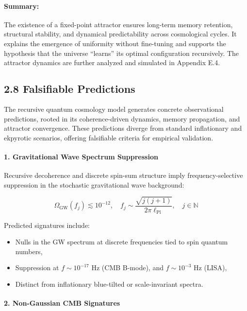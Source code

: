 \paragraph{Summary:}

The existence of a fixed-point attractor ensures long-term memory retention, structural stability, and dynamical predictability across cosmological cycles. It explains the emergence of uniformity without fine-tuning and supports the hypothesis that the universe “learns” its optimal configuration recursively. The attractor dynamics are further analyzed and simulated in Appendix E.4.

\subsection*{2.8 Falsifiable Predictions}

The recursive quantum cosmology model generates concrete observational predictions, rooted in its coherence-driven dynamics, memory propagation, and attractor convergence. These predictions diverge from standard inflationary and ekpyrotic scenarios, offering falsifiable criteria for empirical validation.

\paragraph{1. Gravitational Wave Spectrum Suppression}

Recursive decoherence and discrete spin-sum structure imply frequency-selective suppression in the stochastic gravitational wave background:

\begin{equation}
\Omega_{\text{GW}}(f_j) \lesssim 10^{-12}, \quad f_j \sim \frac{\sqrt{j(j+1)}}{2\pi \ell_{\text{Pl}}}, \quad j \in \mathbb{N}
\end{equation}

Predicted signatures include:
\begin{itemize}
    \item Nulls in the GW spectrum at discrete frequencies tied to spin quantum numbers,
    \item Suppression at \( f \sim 10^{-17} \) Hz (CMB B-mode), and \( f \sim 10^{-3} \) Hz (LISA),
    \item Distinct from inflationary blue-tilted or scale-invariant spectra.
\end{itemize}

\paragraph{2. Non-Gaussian CMB Signatures}

